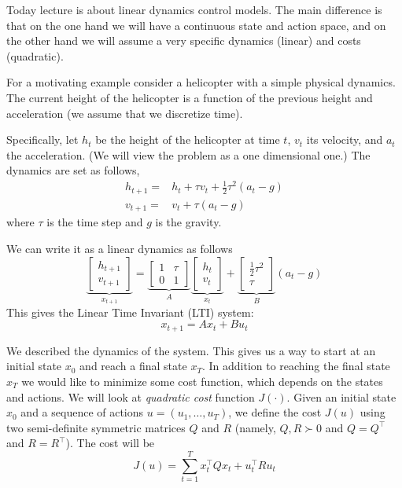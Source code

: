 
Today lecture is about linear dynamics control models. The main
difference is that on the one hand we will have a continuous state
and action space, and on the other hand we will assume a very
specific dynamics (linear) and costs (quadratic).

For a motivating example consider a helicopter with a simple
physical dynamics. The current height of the helicopter is a
function of the previous height and acceleration (we assume that we
discretize time).

Specifically, let $h_t$ be the height of the helicopter at time $t$,
$v_t$ its velocity, and $a_t$ the acceleration. (We will view the
problem as a one dimensional one.) The dynamics are set as follows,
\begin{align*}
h_{t+1} =& h_t +\tau v_t +\frac{1}{2} \tau^2(a_t-g)\\
v_{t+1} = & v_t +\tau (a_t-g)
\end{align*}
where $\tau$ is the time step and $g$ is the gravity.

We can write it as a linear dynamics as follows
\[
\underbrace{
\begin{bmatrix}
h_{t+1}\\
v_{t+1}
\end{bmatrix}}_{x_{t+1}}
= \underbrace{
\begin{bmatrix}
1&\tau\\
0&1
\end{bmatrix}
}_A
\underbrace{
\begin{bmatrix}
h_{t}\\
v_{t}
\end{bmatrix}
}_{x_t} +
\underbrace{\begin{bmatrix}
\frac{1}{2}\tau^2\\
\tau
\end{bmatrix}
}_B
(a_t-g)
\]
This gives the Linear Time Invariant (LTI) system:
\[
x_{t+1}=Ax_t+Bu_t
\]

We described the dynamics of the system. This gives us a way to
start at an initial state $x_0$ and reach a final state $x_T$. In
addition to reaching the final state $x_T$ we would like to minimize
some cost function, which depends on the states and actions. We will
look at {\em quadratic cost} function $J(\cdot)$. Given an initial
state $x_0$ and a sequence of actions $u=(u_1, \ldots , u_{T})$, we
define the cost $J(u)$ using two semi-definite symmetric matrices
$Q$ and $R$ (namely,  $Q,R \succ 0$ and $Q=Q^\top$ and $R=R^\top$).
The cost will be
\[
J(u)=\sum_{t=1}^T x_t^\top Q x_t + u_t^\top R u_t
\]

